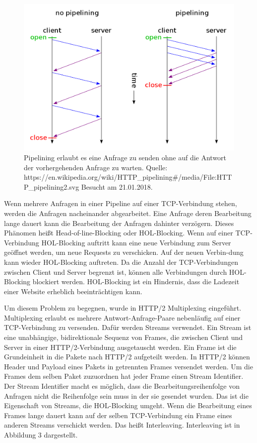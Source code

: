 \documentclass{llncs}
\begin{document}
\begin{figure}[!ht]
\includegraphics[width=\columnwidth]{1200px-HTTP_pipelining2}
\caption{Pipelining erlaubt es eine Anfrage zu senden ohne auf die Antwort der vorhergehenden Anfrage zu warten. Quelle: \newline https://en.wikipedia.org/wiki/HTTP\_pipelining\#/media/File:HTTP\_pipelining2.svg \newline
Besucht am 21.01.2018.}
\end{figure}

Wenn mehrere Anfragen in einer Pipeline auf einer TCP-Verbindung stehen, werden die Anfragen nacheinander abgearbeitet. Eine Anfrage deren Bearbeitung lange dauert kann die Bearbeitung der Anfragen dahinter verzögern. Dieses Phänomen heißt Head-of-line-Blocking oder HOL-Blocking. Wenn auf einer TCP-Verbindung HOL-Blocking auftritt kann eine neue Verbindung zum Server geöffnet werden, um neue Requests zu verschicken. Auf der neuen Verbin-dung kann wieder HOL-Blocking auftreten. Da die Anzahl der TCP-Verbindungen zwischen Client und Server begrenzt ist, können alle Verbindungen durch HOL-Blocking blockiert werden. HOL-Blocking ist ein Hindernis, dass die Ladezeit einer Website erheblich beeinträchtigen kann.

Um diesem Problem zu begegnen, wurde in HTTP/2 Multiplexing eingeführt. Multiplexing erlaubt es mehrere Antwort-Anfrage-Paare nebenläufig auf einer TCP-Verbindung zu versenden. Dafür werden Streams verwendet.
Ein Stream ist eine unabhängige, bidirektionale Sequenz von Frames, die zwischen Client und Server in einer HTTP/2-Verbindung ausgetauscht werden.\cite{Belshe2015}
Ein Frame ist die Grundeinheit in die Pakete nach HTTP/2 aufgeteilt werden. In HTTP/2 können Header und Payload eines Pakets in getrennten Frames versendet werden. Um die Frames dem selben Paket zuzuordnen hat jeder Frame einen Stream Identifier. Der Stream Identifier macht es möglich, dass die Bearbeitungsreihenfolge von Anfragen nicht die Reihenfolge sein muss in der sie gesendet wurden. Das ist die Eigenschaft von Streams, die HOL-Blocking umgeht. Wenn die Bearbeitung eines Frames lange dauert kann auf der selben TCP-Verbindung ein Frame eines anderen Streams verschickt werden. Das heißt Interleaving. Interleaving ist in Abbildung 3 dargestellt.
\end{document}
